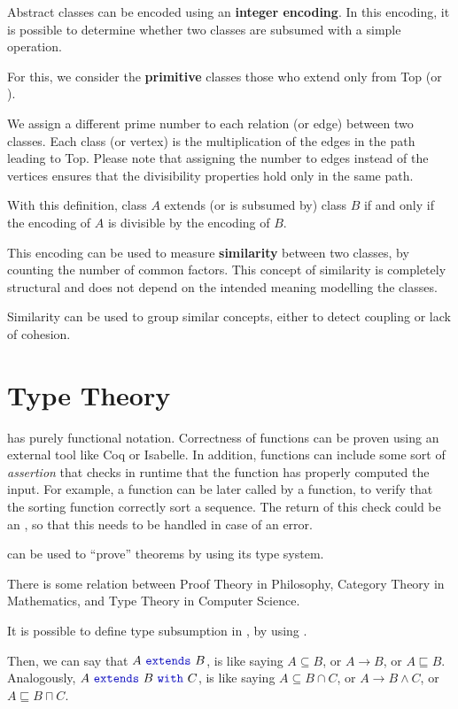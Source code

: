 Abstract classes can be encoded using an \textbf{integer encoding}.
In this encoding, it is possible to determine whether two classes are subsumed with a simple operation.

For this, we consider the \textbf{primitive} classes those who extend only from Top (or ).

We assign a different prime number to each relation (or edge) between two classes.
Each class (or vertex) is the multiplication of the edges in the path leading to Top.
Please note that assigning the number to edges instead of the vertices ensures that the divisibility properties hold only in the same path.

With this definition, class $A$ extends (or is subsumed by) class $B$ if and only if the encoding of $A$ is divisible by the encoding of $B$.

This encoding can be used to measure \textbf{similarity} between two classes, by counting the number of common factors.
This concept of similarity is completely structural and does not depend on the intended meaning modelling the classes.

Similarity can be used to group similar concepts, either to detect coupling or lack of cohesion.


\section{Type Theory}

\Soda has purely functional notation.
Correctness of functions can be proven using an external tool like Coq or Isabelle.
In addition, functions can include some sort of \textit{assertion} that checks in runtime that the function has properly computed the input.
For example, a  function can be later called by a  function, to verify that the sorting function correctly sort a sequence.
The return of this check could be an , so that this needs to be handled in case of an error.

\Soda can be used to ``prove'' theorems by using its type system.

There is some relation between Proof Theory in Philosophy, Category Theory in Mathematics, and Type Theory in Computer Science.

It is possible to define type subsumption in \Soda, by using \sodaextends.

Then, we can say that $A \ \sodaextends\ B$, is like saying $A \subseteq B$, or $A \to B$, or $A \sqsubseteq B$.
Analogously, $A \ \sodaextends\ B \ \sodawith\ C$, is like saying $A \subseteq B \cap C $, or $A \to B \land C$, or $A \sqsubseteq B \sqcap C$.

